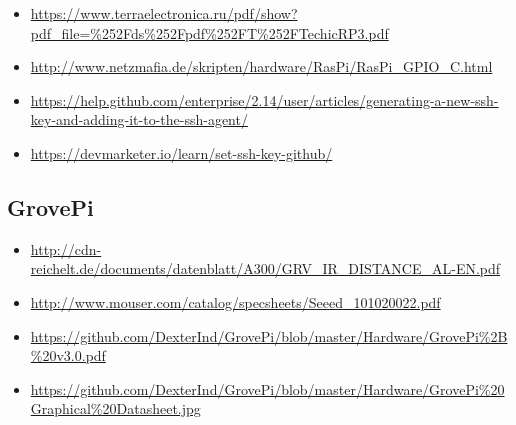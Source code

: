 \documentclass{report}
\begin{document}
\begin{itemize}

\item \url{https://www.terraelectronica.ru/pdf/show?pdf_file=%252Fds%252Fpdf%252FT%252FTechicRP3.pdf}

\item \url{http://www.netzmafia.de/skripten/hardware/RasPi/RasPi_GPIO_C.html}

\item \url{https://help.github.com/enterprise/2.14/user/articles/generating-a-new-ssh-key-and-adding-it-to-the-ssh-agent/}

\item \url{https://devmarketer.io/learn/set-ssh-key-github/}

\end{itemize}

\subsection{GrovePi}

\begin{itemize}

\item \url{http://cdn-reichelt.de/documents/datenblatt/A300/GRV_IR_DISTANCE_AL-EN.pdf}

\item \url{http://www.mouser.com/catalog/specsheets/Seeed_101020022.pdf}

\item \url{https://github.com/DexterInd/GrovePi/blob/master/Hardware/GrovePi%2B%20v3.0.pdf}

\item \url{https://github.com/DexterInd/GrovePi/blob/master/Hardware/GrovePi%20Graphical%20Datasheet.jpg}

\end{itemize}
\end{document}
